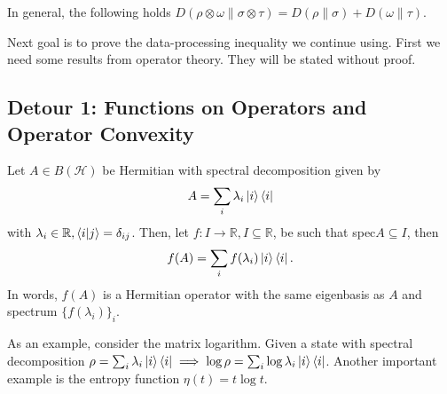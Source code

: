 \documentclass[notoc]{tufte-book}
\begin{document}
In general, the following holds $D(\rho\otimes \omega \| \sigma \otimes \tau) = D(\rho \| \sigma) + D(\omega \| \tau)$.

Next goal is to prove the data-processing inequality we continue using. First we need some results from operator theory. They will be stated without proof. 

\subsection{Detour 1: Functions on Operators and Operator Convexity}
Let $A \in B(\mathcal{H})$ be Hermitian with spectral decomposition given by
\begin{align}
    A = \sum_i \lambda_i \ket{i}\bra{i}
\end{align}
with $\lambda_i \in \mathbb{R}, \braket{i|j}=\delta_{ij}$. Then, let $f:I \rightarrow \mathbb{R}, I \subseteq \mathbb{R}$, be such that spec$A\subseteq I$, then
\begin{align}
    f(A) = \sum_i f(\lambda_i) \ket{i}\bra{i}.
\end{align}
In words, $f(A)$ is a Hermitian operator with the same eigenbasis as $A$ and spectrum $\{f(\lambda_i)\}_i$.

As an example, consider the matrix logarithm. Given a state with spectral decomposition $\rho=\sum_i \lambda_i \ket{i}\bra{i} \implies \log{\rho} = \sum_i \log{\lambda_i} \ket{i}\bra{i}$. Another important example is the entropy function $\eta (t) = t\log{t}$. 
\end{document}
